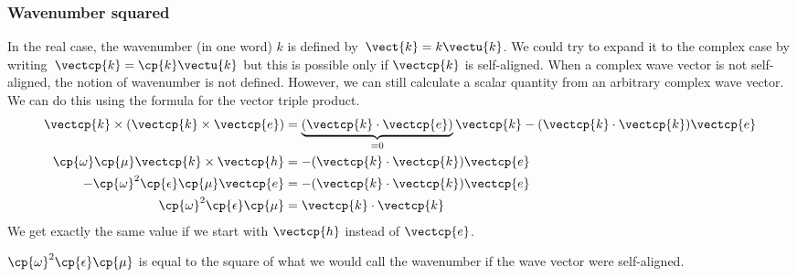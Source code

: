 \subsubsection{Wavenumber squared}
\label{sec:wavenumber_squared}
In the real case, the wavenumber (in one word) $k$ is defined by~$\vect{k}=k \vectu{k}$.
We could try to expand it to the complex case by writing~$\vectcp{k}=\cp{k} \vectu{k}$
but this is possible only if $\vectcp{k}$ is self-aligned.
When a complex wave vector is not self-aligned, the notion of wavenumber is not defined.
However, we can still calculate a scalar quantity from an arbitrary complex wave vector.
We can do this using the formula for the vector triple product.
\begin{subequations}
    \label{eq:k_dot_k}
    \begin{align}
        \vectcp{k} \times (\vectcp{k} \times \vectcp{e})
        &=
        \underbrace{(\vectcp{k} \cdot \vectcp{e})}_{=0}\vectcp{k}
        -
        (\vectcp{k} \cdot \vectcp{k}) \vectcp{e}
        \\
        \cp{\omega} \cp{\mu} \vectcp{k} \times \vectcp{h}
        &=
        -(\vectcp{k} \cdot \vectcp{k}) \vectcp{e}
        \\
        -\cp{\omega}^2 \cp{\epsilon} \cp{\mu} \vectcp{e}
        &=
        -(\vectcp{k} \cdot \vectcp{k}) \vectcp{e}
        \\
        \cp{\omega}^2 \cp{\epsilon} \cp{\mu}
        &=
        \vectcp{k} \cdot \vectcp{k}
    \end{align}
\end{subequations}
We get exactly the same value if we start with $\vectcp{h}$ instead of $\vectcp{e}$.

$\cp{\omega}^2 \cp{\epsilon} \cp{\mu}$ is equal to the square of what we would call the wavenumber if the wave vector were self-aligned.

